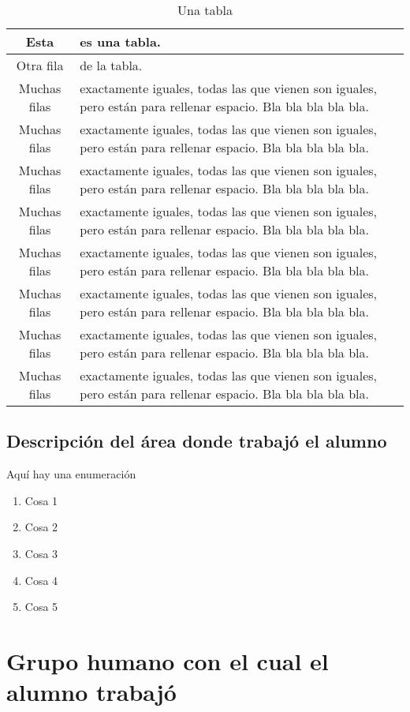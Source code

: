 \documentclass[12pt]{article}
\begin{document}
\begin{table}[H]
\begin{tabular}{|c|p{12cm}|}
\hline
Esta & es una tabla. \\
\hline
Otra fila & de la tabla. \\
\hline
Muchas filas & exactamente iguales, todas las que vienen son iguales, pero están para rellenar espacio. Bla bla bla bla bla. \\
\hline
Muchas filas & exactamente iguales, todas las que vienen son iguales, pero están para rellenar espacio. Bla bla bla bla bla. \\
\hline
Muchas filas & exactamente iguales, todas las que vienen son iguales, pero están para rellenar espacio. Bla bla bla bla bla. \\
\hline
Muchas filas & exactamente iguales, todas las que vienen son iguales, pero están para rellenar espacio. Bla bla bla bla bla. \\
\hline
Muchas filas & exactamente iguales, todas las que vienen son iguales, pero están para rellenar espacio. Bla bla bla bla bla. \\
\hline
Muchas filas & exactamente iguales, todas las que vienen son iguales, pero están para rellenar espacio. Bla bla bla bla bla. \\
\hline
Muchas filas & exactamente iguales, todas las que vienen son iguales, pero están para rellenar espacio. Bla bla bla bla bla. \\
\hline
Muchas filas & exactamente iguales, todas las que vienen son iguales, pero están para rellenar espacio. Bla bla bla bla bla. \\
\hline
\end{tabular}
\caption{Una tabla}
\end{table}

\subsection{Descripción del área donde trabajó el alumno}

Aquí hay una enumeración
\begin{enumerate}
\item Cosa 1
\item Cosa 2
\item Cosa 3
\item Cosa 4
\item Cosa 5
\end{enumerate}

\section{Grupo humano con el cual el alumno trabajó}
\end{document}
